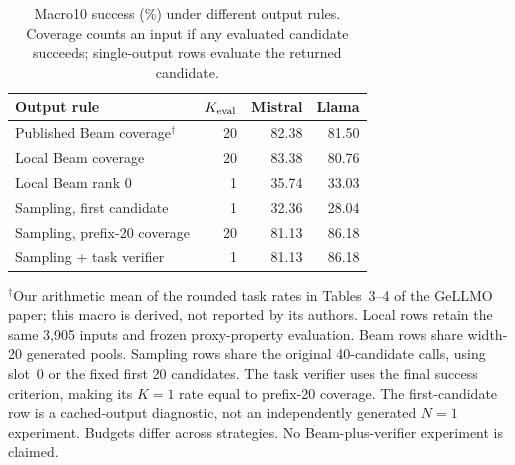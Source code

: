 \begin{table}[t]
\centering\EvalTableFont
\setlength{\tabcolsep}{2.5pt}\renewcommand{\arraystretch}{1.08}
\caption{Macro10 success (\%) under different output rules. Coverage counts an input if any evaluated candidate succeeds; single-output rows evaluate the returned candidate.}
\label{tab:readout_diagnostics}
\begin{tabular*}{\linewidth}{@{\extracolsep{\fill}}lrrr@{}}
\toprule
Output rule & $K_{\rm eval}$ & Mistral & Llama \\
\midrule
Published Beam coverage$^{\dagger}$ & 20 & 82.38 & 81.50 \\
Local Beam coverage & 20 & 83.38 & 80.76 \\
Local Beam rank 0 & 1 & 35.74 & 33.03 \\
\midrule
Sampling, first candidate & 1 & 32.36 & 28.04 \\
Sampling, prefix-20 coverage & 20 & 81.13 & 86.18 \\
Sampling + task verifier & 1 & 81.13 & 86.18 \\
\bottomrule\end{tabular*}
\par\vspace{3pt}\noindent\begin{minipage}{\linewidth}\TableNoteFont
$^{\dagger}$Our arithmetic mean of the rounded task rates in Tables~3--4 of the GeLLMO paper; this macro is derived, not reported by its authors. Local rows retain the same 3,905 inputs and frozen proxy-property evaluation. Beam rows share width-20 generated pools. Sampling rows share the original 40-candidate calls, using slot~0 or the fixed first 20 candidates. The task verifier uses the final success criterion, making its $K=1$ rate equal to prefix-20 coverage. The first-candidate row is a cached-output diagnostic, not an independently generated $N=1$ experiment. Budgets differ across strategies. No Beam-plus-verifier experiment is claimed.
\end{minipage}
\end{table}
